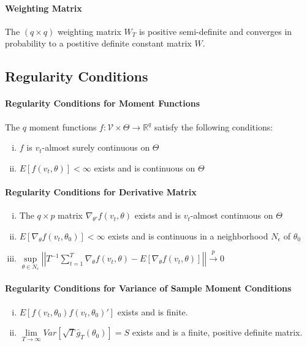 \documentclass[12pt]{article}
\theoremstyle{definition}
\begin{document}
\paragraph{Weighting Matrix} The $(q\times q)$ weighting matrix $W_T$ is positive semi-definite and converges in probability to a postitive definite constant matrix $W$.

\subsection{Regularity Conditions}


\paragraph{Regularity Conditions for Moment Functions}
The $q$ moment functions $f\colon \mathcal{V}\times \Theta \rightarrow \mathbb{R}^q$ satisfy the following conditions:
	\begin{enumerate}[(i)]
		\item $f$ is $v_t$-almost surely continuous on $\Theta$
		\item $E[f(v_t, \theta)]<\infty$ exists and is continuous on $\Theta$
	\end{enumerate}

\paragraph{Regularity Conditions for Derivative Matrix}
	\begin{enumerate}[(i)]
		\item The $q\times p$ matrix $\nabla_{\theta'} f(v_t, \theta)$ exists and is $v_t$-almost continuous on $\Theta$ 
		\item $E[\nabla_{\theta}f(v_t, \theta_0)]<\infty$ exists and is continuous in a  neighborhood $N_\epsilon$ of $\theta_0$
		\item $\underset{\theta \in N_\epsilon}{\sup}\left| \left| T^{-1} \sum_{t=1}^T \nabla_\theta f(v_t, \theta) - E[\nabla_\theta f(v_t, \theta)]\right|\right| \overset{p}{\rightarrow} 0$
	\end{enumerate}

\paragraph{Regularity Conditions for Variance of Sample Moment Conditions}
\begin{enumerate}[(i)]
	\item $E[f(v_t, \theta_0)f(v_t, \theta_0)']$ exists and is finite.
	\item $\underset{T\rightarrow \infty}{\lim} Var\left[\sqrt{T}\bar{g}_T(\theta_0)\right]=S$ exists and is a finite, positive definite matrix.
\end{enumerate}
\end{document}
